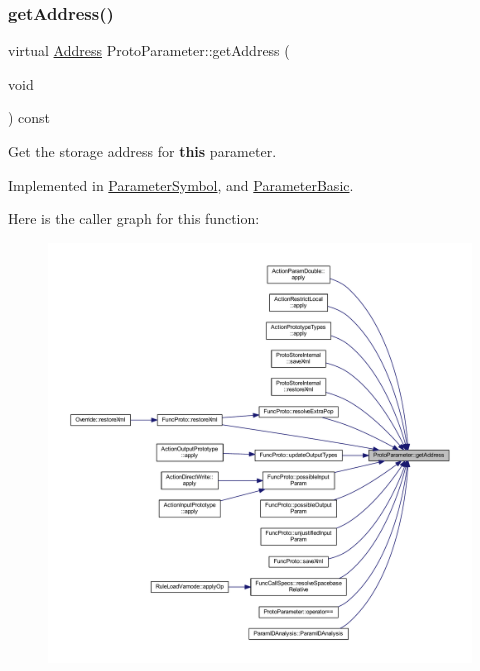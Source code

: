 \subsubsection{\texorpdfstring{getAddress()}{getAddress()}}
{\footnotesize\ttfamily virtual \mbox{\hyperlink{class_address}{Address}} Proto\+Parameter\+::get\+Address (\begin{DoxyParamCaption}\item[{void}]{ }\end{DoxyParamCaption}) const\hspace{0.3cm}{\ttfamily [pure virtual]}}



Get the storage address for {\bfseries{this}} parameter. 



Implemented in \mbox{\hyperlink{class_parameter_symbol_a758e26ad63c7c212d9a70c5a82bbebf4}{Parameter\+Symbol}}, and \mbox{\hyperlink{class_parameter_basic_a0d007e8a1720e88d34aa139d62000c1a}{Parameter\+Basic}}.

Here is the caller graph for this function\+:
\nopagebreak
\begin{figure}[H]
\begin{center}
\leavevmode
\includegraphics[width=350pt]{class_proto_parameter_a33c604ed7e06ae0ca6ac491b46739343_icgraph}
\end{center}
\end{figure}
\mbox{\label{class_proto_parameter_a03d8c36596d1564b5366295ff63fc182}} 
